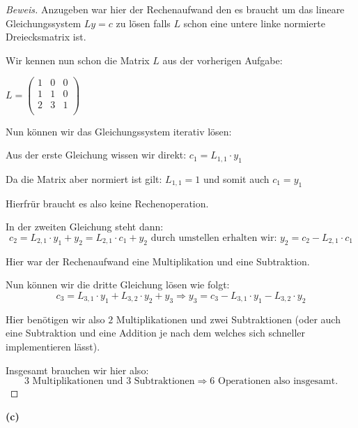\documentclass[10pt]{article}
\begin{document}
\begin{proof}[Beweis]
	Anzugeben war hier der Rechenaufwand den es braucht um das lineare Gleichungssystem
	$Ly = c$ zu lösen falls $L$ schon eine untere linke normierte Dreiecksmatrix ist.

	Wir kennen nun schon die Matrix $L$ aus der vorherigen Aufgabe:

	\begin{center}
		
	$L = 
	\begin{pmatrix}
		1 & 0 & 0 \\
		1 & 1 & 0 \\
		2 & 3 & 1 \\
	\end{pmatrix}$

	\end{center}
	Nun können wir das Gleichungssystem iterativ lösen:

	Aus der erste Gleichung wissen wir direkt: $c_1 = L_{1,1} \cdot y_1$
	
	Da die Matrix aber normiert ist gilt: $L_{1,1} = 1$ und somit auch $c_1 = y_1$

	Hierfrür braucht es also keine Rechenoperation.

	In der zweiten Gleichung steht dann: 
	$$c_2 = L_{2,1} \cdot y_1 + y_2 = L_{2,1} \cdot c_1 + y_2 \text{ durch umstellen erhalten wir: }
	y_2 = c_2 - L_{2,1} \cdot c_1$$

	Hier war der Rechenaufwand eine Multiplikation und eine Subtraktion.

	Nun können wir die dritte Gleichung lösen wie folgt:
	$$c_3 = L_{3,1} \cdot y_1 + L_{3,2} \cdot y_2 + y_3 \Rightarrow
	y_3 = c_3 - L_{3,1} \cdot y_1 - L_{3,2} \cdot y_2$$

	Hier benötigen wir also $2$ Multiplikationen und zwei Subtraktionen
	(oder auch eine Subtraktion und eine Addition je nach dem welches sich schneller
	implementieren lässt).
	
	Insgesamt brauchen wir hier also:
	$$3 \text{ Multiplikationen und } 3 \text{ Subtraktionen} \Rightarrow 6 \text{ Operationen also insgesamt.}$$

\end{proof} 

\textbf{(c)}
\end{document}
